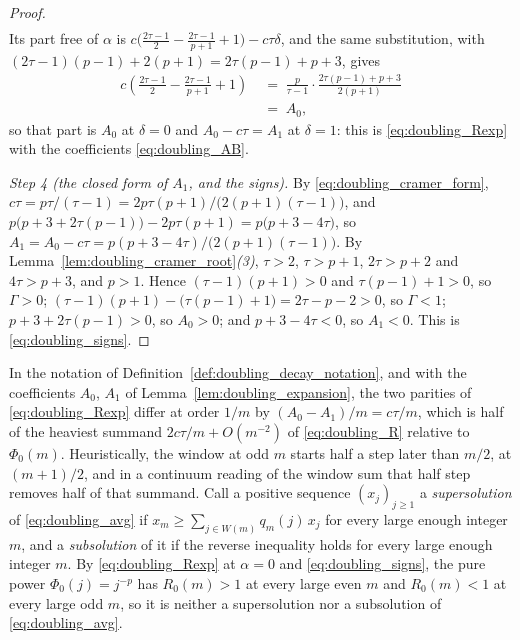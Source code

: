 \begin{proof}
\begin{equation}
\begin{aligned}
\end{aligned}
\end{equation}
Its part free of $\alpha$ is
$c\bigl(\frac{2\tau-1}{2}-\frac{2\tau-1}{p+1}+1\bigr)-c\tau\delta$, and the same substitution,
with $(2\tau-1)(p-1)+2(p+1)=2\tau(p-1)+p+3$, gives
\begin{equation}
\begin{aligned}
    c\left(\frac{2\tau-1}{2}-\frac{2\tau-1}{p+1}+1\right)
    \;&=\;\frac{p}{\tau-1}\cdot\frac{2\tau(p-1)+p+3}{2(p+1)}\\
    \;&=\;A_0 ,
\end{aligned}
\end{equation}
so that part is $A_0$ at $\delta=0$ and $A_0-c\tau=A_1$ at $\delta=1$: this is
\eqref{eq:doubling_Rexp} with the coefficients \eqref{eq:doubling_AB}.

\emph{Step 4 (the closed form of $A_1$, and the signs).} By \eqref{eq:doubling_cramer_form},
$c\tau=p\tau/(\tau-1)=2p\tau(p+1)\big/\bigl(2(p+1)(\tau-1)\bigr)$, and
$p\bigl(p+3+2\tau(p-1)\bigr)-2p\tau(p+1)=p\bigl(p+3-4\tau\bigr)$, so
$A_1=A_0-c\tau=p(p+3-4\tau)\big/\bigl(2(p+1)(\tau-1)\bigr)$. By
Lemma~\ref{lem:doubling_cramer_root}\emph{(3)}, $\tau>2$, $\tau>p+1$, $2\tau>p+2$ and
$4\tau>p+3$, and $p>1$. Hence $(\tau-1)(p+1)>0$ and $\tau(p-1)+1>0$, so $\Gamma>0$;
$(\tau-1)(p+1)-\bigl(\tau(p-1)+1\bigr)=2\tau-p-2>0$, so $\Gamma<1$; $p+3+2\tau(p-1)>0$, so
$A_0>0$; and $p+3-4\tau<0$, so $A_1<0$. This is \eqref{eq:doubling_signs}.
\end{proof}

\begin{remark}\label{rem:doubling_parity}
In the notation of Definition~\ref{def:doubling_decay_notation}, and with the coefficients
$A_0$, $A_1$ of Lemma~\ref{lem:doubling_expansion}, the two parities of
\eqref{eq:doubling_Rexp} differ at order $1/m$ by $(A_0-A_1)/m=c\tau/m$, which is half of the
heaviest summand $2c\tau/m+O(m^{-2})$ of \eqref{eq:doubling_R} relative to $\Phi_0(m)$.
Heuristically, the window at odd $m$ starts half a step later than $m/2$, at $(m+1)/2$, and in
a continuum reading of the window sum that half step removes half of that summand. Call a
positive sequence $(x_j)_{j\geq1}$ a \emph{supersolution} of \eqref{eq:doubling_avg} if
$x_m\geq\sum_{j\in W(m)}q_m(j)\,x_j$ for every large enough integer $m$, and a
\emph{subsolution} of it if the reverse inequality holds for every large enough integer $m$.
By \eqref{eq:doubling_Rexp} at $\alpha=0$ and \eqref{eq:doubling_signs}, the pure power
$\Phi_0(j)=j^{-p}$ has $R_0(m)>1$ at every large even $m$ and $R_0(m)<1$ at every large odd
$m$, so it is neither a supersolution nor a subsolution of \eqref{eq:doubling_avg}.
\end{remark}

